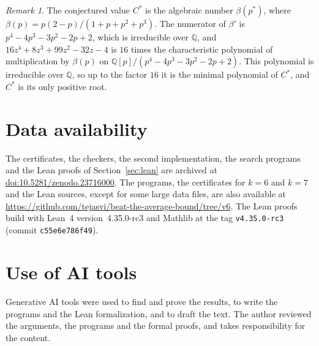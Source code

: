 \documentclass[11pt]{amsart}
\theoremstyle{definition}
\theoremstyle{remark}
\newtheorem{remark}[theorem]{Remark}
\numberwithin{equation}{section}
\newcommand{\ZENODODOI}{10.5281/zenodo.23716000}
\newcommand{\REPOURL}{https://github.com/tejasvi/beat-the-average-bound/tree/v6}
\newcommand{\LEANVER}{4.35.0-rc3}
\newcommand{\MATHLIBTAG}{v4.35.0-rc3}
\newcommand{\MATHLIBCOMMIT}{c55e6e786f49}
\begin{document}
\begin{remark}\label{rem:exact}
The conjectured value $C^*$ is the algebraic number $\beta(p^*)$, where $\beta(p)=p(2-p)/(1+p+p^2+p^3)$. The numerator of $\beta'$ is $p^4-4p^3-3p^2-2p+2$, which is irreducible over $\mathbb{Q}$, and $16z^4+8z^3+99z^2-32z-4$ is $16$ times the characteristic polynomial of multiplication by $\beta(p)$ on $\mathbb{Q}[p]/(p^4-4p^3-3p^2-2p+2)$. This polynomial is irreducible over $\mathbb{Q}$, so up to the factor $16$ it is the minimal polynomial of $C^*$, and $C^*$ is its only positive root.
\end{remark}



\section*{Data availability}
The certificates, the checkers, the second implementation, the search programs and the Lean proofs of Section~\ref{sec:lean} are archived at \href{https://doi.org/\ZENODODOI}{doi:\ZENODODOI}. The programs, the certificates for $k=6$ and $k=7$ and the Lean sources, except for some large data files, are also available at \url{\REPOURL}. The Lean proofs build with Lean~4 version~\LEANVER{} and Mathlib at the tag \texttt{\MATHLIBTAG} (commit \texttt{\MATHLIBCOMMIT}).

\section*{Use of AI tools}
Generative AI tools were used to find and prove the results, to write the programs and the Lean formalization, and to draft the text. The author reviewed the arguments, the programs and the formal proofs, and takes responsibility for the content.
\end{document}
